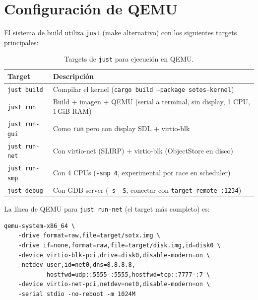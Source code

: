 \documentclass[11pt,twoside,openright]{book}
\theoremstyle{definition}
\theoremstyle{plain}
\theoremstyle{remark}
\begin{document}
\section{Configuración de QEMU}
\label{sec:qemu-config}

El sistema de build utiliza \texttt{just} (make alternativo) con los siguientes
targets principales:

\begin{table}[ht]
\centering
\caption{Targets de \texttt{just} para ejecución en QEMU.}
\label{tab:just-targets}
\begin{tabular}{@{}lp{9cm}@{}}
\toprule
\textbf{Target} & \textbf{Descripción} \\
\midrule
\texttt{just build}    & Compilar el kernel (\texttt{cargo build --package sotos-kernel}) \\
\texttt{just run}      & Build + imagen + QEMU (serial a terminal, sin display, 1 CPU, 1\,GiB RAM) \\
\texttt{just run-gui}  & Como \texttt{run} pero con display SDL + virtio-blk \\
\texttt{just run-net}  & Con virtio-net (SLIRP) + virtio-blk (ObjectStore en disco) \\
\texttt{just run-smp}  & Con 4 CPUs (\texttt{-smp 4}, experimental por race en scheduler) \\
\texttt{just debug}    & Con GDB server (\texttt{-s -S}, conectar con \texttt{target remote :1234}) \\
\bottomrule
\end{tabular}
\end{table}

La línea de QEMU para \texttt{just run-net} (el target más completo) es:

\begin{lstlisting}[language={},basicstyle=\ttfamily\scriptsize,frame=single,breaklines=true,caption={Comando QEMU para \texttt{just run-net}.},label={lst:qemu-cmd}]
qemu-system-x86_64 \
    -drive format=raw,file=target/sotx.img \
    -drive if=none,format=raw,file=target/disk.img,id=disk0 \
    -device virtio-blk-pci,drive=disk0,disable-modern=on \
    -netdev user,id=net0,dns=8.8.8.8,
            hostfwd=udp::5555-:5555,hostfwd=tcp::7777-:7 \
    -device virtio-net-pci,netdev=net0,disable-modern=on \
    -serial stdio -no-reboot -m 1024M
\end{lstlisting}
\end{document}
